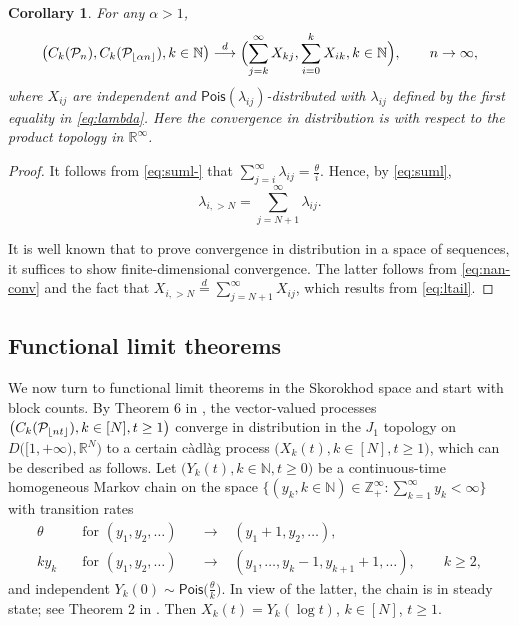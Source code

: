 \documentclass[11pt]{article}
\newcommand{\R}{\mathbb{R}}
\newcommand{\N}{\mathbb{N}}
\newcommand{\1}[1][]{
	\ifx&#1&\mathds{1}
	\else\mathds{1}\left\{#1\right\}\fi}
\newcommand{\dto}{\overset{d}{\longrightarrow}}
\newcommand{\deq}{\overset{d}{=}}
\newcommand{\Pois}[1]{\mathsf{Pois}(#1)}
\newcommand{\Pc}{\mathcal{P}}
\DeclarePairedDelimiter\floor{\lfloor}{\rfloor}
\newtheorem{corollary}{Corollary}[section]
\theoremstyle{definition}
\theoremstyle{remark}
\numberwithin{equation}{section}
\begin{document}
	\begin{corollary}
		For any $\alpha>1$,
		\begin{equation}
			\label{eq:nan-conv2}
			\bigl(C_k(\Pc_n), C_k(\Pc_{\floor{\alpha n}}), k\in\N\bigr) \dto 
			\Bigl(\sum_{j=k}^\infty X_{kj}, \sum_{i=0}^k X_{ik}, k\in\N\Bigr), \qquad n\to\infty,
		\end{equation}
		where $X_{ij}$ are independent and $\Pois{\lambda_{ij}}$-distributed with $\lambda_{ij}$ defined by the first equality in \eqref{eq:lambda}. Here the convergence in distribution is with respect to the product topology in $\R^\infty$.
	\end{corollary}
	\begin{proof}
		It follows from \eqref{eq:suml-} that $\sum_{j=i}^\infty\lambda_{ij}=\frac{\theta}{i}$. Hence, by \eqref{eq:suml},
		\begin{equation}
			\label{eq:ltail}
			\lambda_{i,>N} = \sum_{j=N+1}^\infty\lambda_{ij}.
		\end{equation}
		
		It is well known that to prove convergence in distribution in a space of sequences, it suffices
		to show finite-dimensional convergence. The latter follows from \eqref{eq:nan-conv}
		 and the fact that $X_{i,>N}\deq\sum_{j=N+1}^\infty X_{ij}$, which results from \eqref{eq:ltail}.
	\end{proof}
	
	\subsection{Functional limit theorems}
	We now turn to functional limit theorems in the Skorokhod space and start with block counts.
	By Theorem 6 in \cite{GS23}, the vector-valued processes $\bigl(C_k(\Pc_{\floor{nt}}), k\in [N], t\ge1\bigr)$
	converge in distribution in the $J_1$ topology on $D\bigl([1,+\infty),\R^N\bigr)$ to a certain c\`adl\`ag process
	$\bigl(X_k(t), k \in [N], t\ge1\bigr)$, which can be described as follows.    
	Let $\bigl(Y_k(t), k\in\N, t\ge0 \bigr)$ be a continuous-time homogeneous Markov chain on the space
	$\bigl\{(y_k, k\in\N)\in\mathbb{Z}_+^\infty: \sum_{k=1}^\infty y_k<\infty\bigr\}$ with transition rates
	\begin{equation}
		\label{eq:rates}
		\begin{aligned}
			\theta \quad &\text{for } (y_1,y_2,\ldots) && \to \;\;\; (y_1+1,y_2,\ldots),\\
			ky_{k} \quad &\text{for } (y_1,y_2,\ldots) && \to \;\;\; (y_1,\ldots,y_k-1,y_{k+1}+1,\ldots), \qquad k\ge2,
		\end{aligned}
	\end{equation}
	and independent $Y_k(0)\sim\mathsf{Pois}\bigl(\frac{\theta}{k}\bigr)$. In view of the latter,
	the chain is in steady state; see Theorem 2 in \cite{GS23}. Then $X_k(t)=Y_k(\log t)$, $k\in [N]$, $t\ge1$.
	
\end{document}
